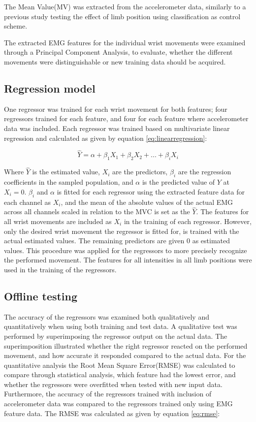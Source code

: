 The Mean Value(MV) was extracted from the accelerometer data, similarly to a previous study \cite{Krasoulis2015} testing the effect of limb position using classification as control scheme. 

The extracted EMG features for the individual wrist movements were examined through a Principal Component Analysis, to evaluate, whether the different movements were distinguishable or new training data should be acquired.

\subsection{Regression model}
One regressor was trained for each wrist movement for both features; four regressors trained for each feature, and four for each feature where accelerometer data was included. Each regressor was trained based on multivariate linear regression and calculated as given by equation \ref{eq:linearregression}:

\begin{equation} \label{eq:linearregression}
\hat{Y} = \alpha + \beta_1 X_{1} + \beta_2 X_{2} + ... + \beta_i X_{i}
\end{equation}

Where $\hat{Y}$ is the estimated value, $X_i$ are the predictors, $\beta_i$ are the regression coefficients in the sampled population, and $\alpha$ is the predicted value of $Y$ at $X_{i} = 0$. $\beta_i$ and $\alpha$ is fitted for each regressor using the extracted feature data for each channel as $X_i$, and the mean of the absolute values of the actual EMG across all channels scaled in relation to the MVC is set as the $\hat{Y}$. The features for all wrist movements are included as $X_i$ in the training of each regressor. However, only the desired wrist movement the regressor is fitted for, is trained with the actual estimated values. The remaining predictors are given 0 as estimated values. This procedure was applied for the regressors to more precisely recognize the performed movement. The features for all intensities in all limb positions were used in the training of the regressors.

\subsection{Offline testing}
The accuracy of the regressors was examined both qualitatively and quantitatively when using both training and test data. A qualitative test was performed by superimposing the regressor output on the actual data. The superimposition illustrated whether the right regressor reacted on the performed movement, and how accurate it responded compared to the actual data. For the quantitative analysis the Root Mean Square Error(RMSE) was calculated to compare through statistical analysis, which feature had the lowest error, and whether the regressors were overfitted when tested with new input data. Furthermore, the accuracy of the regressors trained with inclusion of accelerometer data was compared to the regressors trained only using EMG feature data. The RMSE was calculated as given by equation \ref{eq:rmse}:

